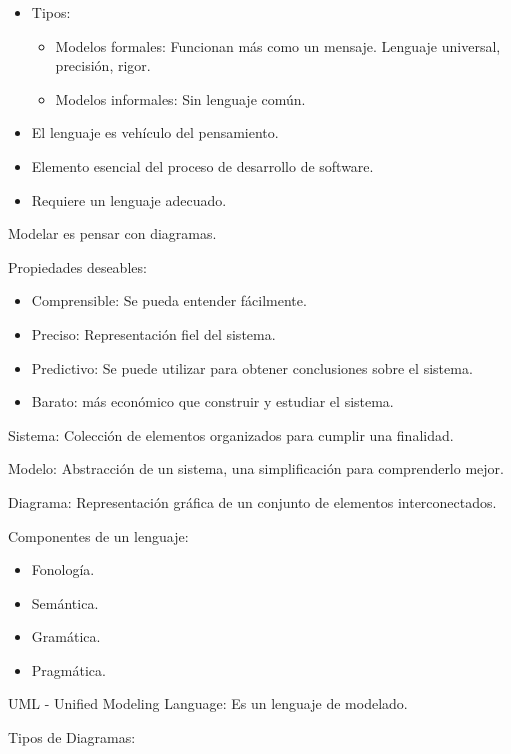 \documentclass[12pt, twoside, openright]{report} %
\begin{document}
\begin{itemize}
	\item Tipos:

	      \begin{itemize}
		      \item Modelos formales: Funcionan más como un mensaje. Lenguaje
		            universal, precisión, rigor.
		      \item Modelos informales: Sin lenguaje común.
	      \end{itemize}
	\item El lenguaje es vehículo del pensamiento.
	\item Elemento esencial del proceso de desarrollo de software.
	\item Requiere un lenguaje adecuado.
\end{itemize}

Modelar es pensar con diagramas.

Propiedades deseables:

\begin{itemize}
	\item Comprensible: Se pueda entender fácilmente.
	\item Preciso: Representación fiel del sistema.
	\item Predictivo: Se puede utilizar para obtener conclusiones sobre el
	      sistema.
	\item Barato: más económico que construir y estudiar el sistema.
\end{itemize}

Sistema: Colección de elementos organizados para cumplir una
finalidad.

Modelo: Abstracción de un sistema, una simplificación para
comprenderlo mejor.

Diagrama: Representación gráfica de un conjunto de elementos
interconectados.

Componentes de un lenguaje:

\begin{itemize}
	\item Fonología.
	\item Semántica.
	\item Gramática.
	\item Pragmática.
\end{itemize}

UML - Unified Modeling Language: Es un lenguaje de modelado.

Tipos de Diagramas:
\end{document}
